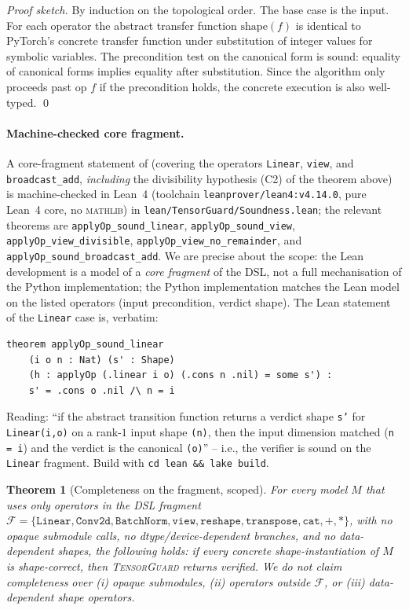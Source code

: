 \documentclass{article}
\newtheorem{theorem}{Theorem}
\theoremstyle{definition}
\begin{document}
\begin{proof}[Proof sketch]
By induction on the topological order. The base case is the input.
For each operator the abstract transfer function $\mathrm{shape}(f)$
is identical to PyTorch's concrete transfer function under
substitution of integer values for symbolic variables. The
precondition test on the canonical form is sound: equality of
canonical forms implies equality after substitution. Since the
algorithm only proceeds past op $f$ if the precondition holds, the
concrete execution is also well-typed. \qed
\end{proof}

\paragraph{Machine-checked core fragment.}
A core-fragment statement of  (covering the
operators \texttt{Linear}, \texttt{view}, and \texttt{broadcast\_add},
\emph{including} the divisibility hypothesis (C2) of the theorem
above) is machine-checked in Lean~4 (toolchain
\texttt{leanprover/lean4:v4.14.0}, pure Lean~4 core, no
\textsc{mathlib}) in
\verb|lean/TensorGuard/Soundness.lean|; the relevant theorems are
\texttt{applyOp\_sound\_linear}, \texttt{applyOp\_sound\_view},
\texttt{applyOp\_view\_divisible}, \texttt{applyOp\_view\_no\_remainder},
and \texttt{applyOp\_sound\_broadcast\_add}. We are precise about the
scope: the Lean development is a model of a \emph{core fragment} of
the DSL, not a full mechanisation of the Python implementation; the
Python implementation matches the Lean model on the listed
operators (input precondition, verdict shape). The Lean statement of
the \texttt{Linear} case is, verbatim:

\begin{lstlisting}
theorem applyOp_sound_linear
    (i o n : Nat) (s' : Shape)
    (h : applyOp (.linear i o) (.cons n .nil) = some s') :
    s' = .cons o .nil /\ n = i
\end{lstlisting}

Reading: ``if the abstract transition function returns a verdict
shape \texttt{s'} for \texttt{Linear(i,o)} on a rank-$1$ input shape
\texttt{(n)}, then the input dimension matched (\texttt{n = i}) and
the verdict is the canonical \texttt{(o)}'' -- i.e., the verifier is
sound on the \texttt{Linear} fragment. Build with
\texttt{cd lean \&\& lake build}.

\begin{theorem}[Completeness on the fragment, scoped]
\label{thm:completeness-dsl}
For every model $M$ that uses \emph{only} operators in the DSL
fragment
$\mathcal F = \{\mathtt{Linear}, \mathtt{Conv2d}, \mathtt{BatchNorm},
\mathtt{view}, \mathtt{reshape}, \mathtt{transpose}, \mathtt{cat},
+, *\}$, with no opaque submodule calls, no dtype/device-dependent
branches, and no data-dependent shapes, the following holds: if
every concrete shape-instantiation of $M$ is shape-correct, then
\textsc{TensorGuard} returns \textsf{verified}. We do not claim
completeness over (i) opaque submodules, (ii) operators outside
$\mathcal F$, or (iii) data-dependent shape operators.
\end{theorem}
\end{document}
